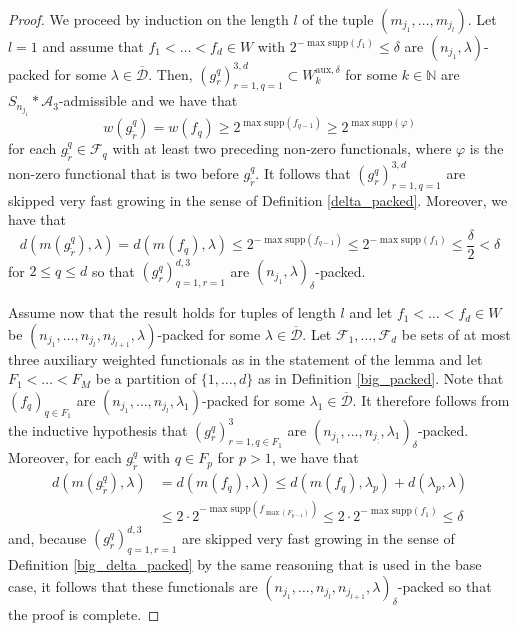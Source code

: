 \documentclass[12pt,a4paper]{amsart}
\newcommand{\N}{\mathbb{N}}
\newcommand{\bes}{\begin{equation*}}
\newcommand{\ees}{\end{equation*}}
\newcommand{\supp}{\text{supp}}
\theoremstyle{definition}
\theoremstyle{plain}
\begin{document}
\begin{proof}
We proceed by induction on the length $l$ of the tuple $(m_{j_{1}},\ldots,m_{j_{l}})$. Let $l=1$ and assume that $f_{1}<\ldots<f_{d}\in W$ with $2^{-\max\supp(f_{1})}\leq\delta$ are $(n_{j_{1}},\lambda)$-packed for some $\lambda\in\overline{\mathcal{D}}$. Then, $(g^{q}_{r})_{r=1,q=1}^{3,d}\subset W^{\text{aux},\delta}_{k}$ for some $k\in\N$ are $S_{n_{j_{1}}}\ast\mathcal{A}_{3}$-admissible and we have that
\bes w(g^{q}_{\tilde{r}})=w(f_{q})\geq 2^{\max\supp(f_{q-1})}\geq 2^{\max\supp(\varphi)} \ees
for each $g^{q}_{\tilde{r}}\in\mathcal{F}_{q}$ with at least two preceding non-zero functionals, where $\varphi$ is the non-zero functional that is two before $g^{q}_{\tilde{r}}$. It follows that $(g^{q}_{r})_{r=1,q=1}^{3,d}$ are skipped very fast growing in the sense of Definition \ref{delta_packed}. Moreover, we have that
\bes d(m(g^{q}_{\tilde{r}}),\lambda)=d(m(f_{q}),\lambda) \leq 2^{-\max\supp(f_{q-1})} \leq 2^{-\max\supp(f_{1})}\leq\frac{\delta}{2}< \delta \ees
for $2\leq q\leq d$ so that $(g^{q}_{r})_{q=1,r=1}^{d,3}$ are $(n_{j_{1}},\lambda)_{\delta}$-packed.

Assume now that the result holds for tuples of length $l$ and let $f_{1}<\ldots<f_{d}\in W$ be $(n_{j_{1}},\ldots,n_{j_{l}},n_{j_{l+1}},\lambda)$-packed for some $\lambda\in\overline{\mathcal{D}}$. Let $\mathcal{F}_{1},\ldots,\mathcal{F}_{d}$ be sets of at most three auxiliary weighted functionals as in the statement of the lemma and let $F_{1}<\ldots<F_{M}$ be a partition of $\{1,\ldots,d\}$ as in Definition \ref{big_packed}. Note that $(f_{q})_{q\in F_{1}}$ are $(n_{j_{1}},\ldots,n_{j_{l}},\lambda_{1})$-packed for some $\lambda_{1}\in\overline{\mathcal{D}}$. It therefore follows from the inductive hypothesis that $(g^{q}_{r})_{r=1,q\in F_{1}}^{3}$ are $(n_{j_{1}},\ldots,n_{j_{;}},\lambda_{1})_{\delta}$-packed. Moreover, for each $g^{q}_{\tilde{r}}$ with $q\in F_{p}$ for $p>1$, we have that
\begin{align*} d(m(g^{q}_{\tilde{r}}),\lambda)&=d(m(f_{q}),\lambda) \leq d(m(f_{q}),\lambda_{p})+d(\lambda_{p},\lambda) \\ &\leq 2\cdot 2^{-\max\supp(f_{\max(F_{p-1})})}\leq 2\cdot 2^{-\max\supp(f_{1})}\leq \delta \end{align*}
and, because $(g^{q}_{r})_{q=1,r=1}^{d,3}$ are skipped very fast growing in the sense of Definition \ref{big_delta_packed} by the same reasoning that is used in the base case, it follows that these functionals are $(n_{j_{1}},\ldots,n_{j_{l}},n_{j_{l+1}},\lambda)_{\delta}$-packed so that the proof is complete.
\end{proof}
\end{document}
